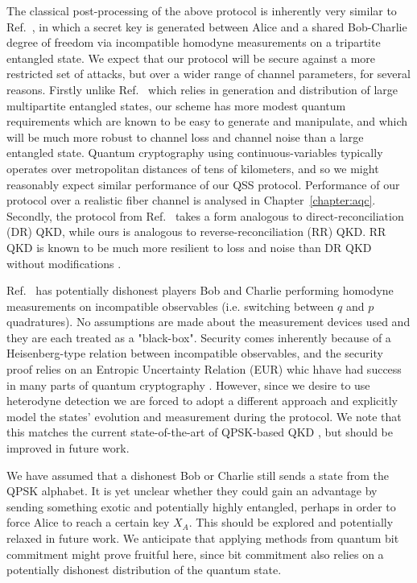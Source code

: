 The classical post-processing of the above protocol is inherently very similar to Ref.~\cite{Kogias2017}, in which a secret key is generated between Alice and a shared Bob-Charlie degree of freedom via incompatible homodyne measurements on a tripartite entangled state. We expect that our protocol will be secure against a more restricted set of attacks, but over a wider range of channel parameters, for several reasons.  Firstly unlike Ref.~\cite{Kogias2017} which relies in generation and distribution of large multipartite entangled states, our scheme has more modest quantum requirements which are known to be easy to generate and manipulate, and which will be much more robust to channel loss and channel noise than a large entangled state. Quantum cryptography using continuous-variables typically operates over metropolitan distances of tens of kilometers, and so we might reasonably expect similar performance of our QSS protocol. Performance of our protocol over a realistic fiber channel is analysed in Chapter~\ref{chapter:aqc}. Secondly, the protocol from Ref.~\cite{Kogias2017} takes a form analogous to direct-reconciliation (DR) QKD, while ours is analogous to reverse-reconciliation (RR) QKD. RR QKD is known \cite{Grosshans2002, Grosshans2003, Laudenbach2017} to be much more resilient to loss and noise than DR QKD without modifications \cite{Silberhorn2002}.

Ref.~\cite{Kogias2017} has potentially dishonest players Bob and Charlie performing homodyne measurements on incompatible observables (i.e. switching between $q$ and $p$ quadratures). No assumptions are made about the measurement devices used and they are each treated as a "black-box". Security comes inherently because of a Heisenberg-type relation between incompatible observables, and the security proof relies on an Entropic Uncertainty Relation (EUR) whic hhave had success in many parts of quantum cryptography \cite{Furrer2012, Furrer2017}. However, since we desire to use heterodyne detection we are forced to adopt a different approach and explicitly model the states' evolution and measurement during the protocol. We note that this matches the current state-of-the-art of QPSK-based QKD \cite{Papanastasiou2018}, but should be improved in future work.

We have assumed that a dishonest Bob or Charlie still sends a state from the QPSK alphabet. It is yet unclear whether they could gain an advantage by sending something exotic and potentially highly entangled, perhaps in order to force Alice to reach a certain key $X_A$. This should be explored and potentially relaxed in future work. We anticipate that applying methods from quantum bit commitment \cite{Broadbent2015} might prove fruitful here, since bit commitment also relies on a potentially dishonest distribution of the quantum state.

